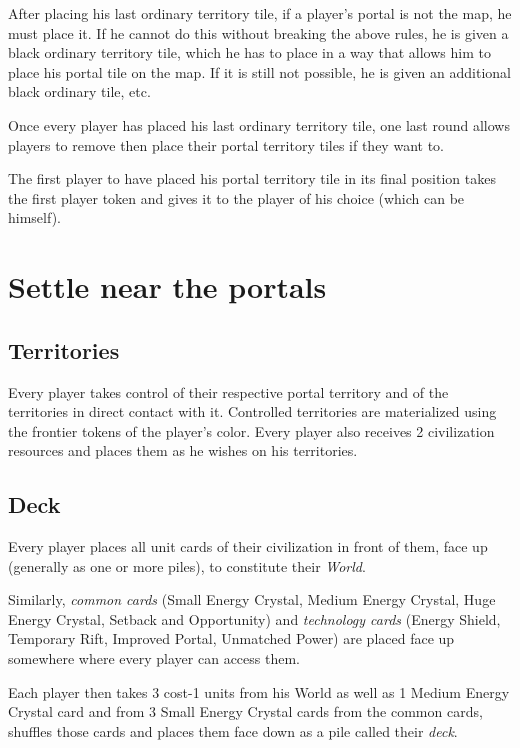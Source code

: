 \documentclass[a4paper]{article}
\begin{document}
        After placing his last ordinary territory tile,
        if a player's portal is not the map, he must place it.
        If he cannot do this without breaking the above rules,
        he is given a black ordinary territory tile,
        which he has to place in a way that allows him to place his portal tile on the map.
        If it is still not possible, he is given an additional black ordinary tile, etc.
        
        Once every player has placed his last ordinary territory tile,
        one last round allows players to remove then place their portal territory tiles
        if they want to.
        
        The first player to have placed his portal territory tile in its final position
        takes the first player token and gives it to the player of his choice
        (which can be himself).
    

\section{Settle near the portals}
    \subsection{Territories}
        Every player takes control of their respective portal territory
        and of the territories in direct contact with it.
        Controlled territories are materialized using the frontier tokens
        of the player's color.
        Every player also receives 2 civilization resources
        and places them as he wishes on his territories.
        
    \subsection{Deck}
        Every player places all unit cards of their civilization in front of them,
        face up (generally as one or more piles), to constitute their \textit{World}.

        Similarly, \textit{common cards} (Small Energy Crystal, Medium Energy Crystal,
        Huge Energy Crystal, Setback and Opportunity) and \textit{technology cards}
        (Energy Shield, Temporary Rift, Improved Portal, Unmatched Power)
        are placed face up somewhere where every player can access them.
        
        Each player then takes  3 cost-1 units from his World as well as
        1 Medium Energy Crystal card and from 3 Small Energy Crystal cards
        from the common cards,
        shuffles those cards and places them face down
        as a pile called their \textit{deck}.
        
\end{document}
